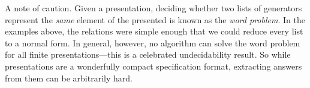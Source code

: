 \begin{remark}
    \label{rem:word-problem}
    A note of caution.
    Given a presentation, deciding whether two lists of generators represent the \emph{same} element of the presented  is known as the \emph{word problem}.
    In the examples above, the relations were simple enough that we could reduce every list to a normal form.
    In general, however, no algorithm can solve the word problem for all finite presentations---this is a celebrated undecidability result.
    So while presentations are a wonderfully compact specification format, extracting answers from them can be arbitrarily hard.
\end{remark}


